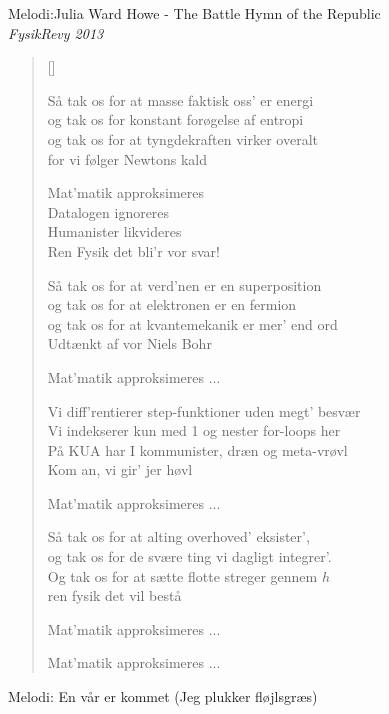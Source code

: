 {Melodi:Julia Ward Howe - The Battle Hymn of the Republic}\\[.2em]
{\small\itshape FysikRevy  2013}
\begin{multicols}{2}
\settowidth{\versewidth}{Vi diff'rentierer step-funktioner uden megt' besvær}
\begin{verse}[\versewidth]

Så tak os for at masse faktisk oss' er energi\\
og tak os for konstant forøgelse af entropi\\
og tak os for at tyngdekraften virker overalt\\
for vi følger Newtons kald

Mat'matik approksimeres\\
Datalogen ignoreres\\
Humanister likvideres\\
Ren Fysik det bli'r vor svar!

Så tak os for at verd'nen er en superposition\\
og tak os for at elektronen er en fermion\\
og tak os for at kvantemekanik er mer' end ord\\
Udtænkt af vor Niels Bohr

Mat'matik approksimeres ...

Vi diff'rentierer step-funktioner uden megt' besvær\\
Vi indekserer kun med 1 og nester for-loops her\\
På KUA har I kommunister, dræn og meta-vrøvl\\
Kom an, vi gir' jer høvl

Mat'matik approksimeres ...

Så tak os for at alting overhoved' eksister',\\
og tak os for de svære ting vi dagligt integrer'.\\
Og tak os for at sætte flotte streger gennem $h$\\
ren fysik det vil bestå

Mat'matik approksimeres ...

Mat'matik approksimeres ...
\end{verse}
\end{multicols}
\newpage

\renewcommand{\thepage}{10}
\thispagestyle{sangbog}
\renewcommand{\thepoem}{12}

\newcommand{\boldpage}[1]{{ \boldmath$#1$}}
{Melodi: En vår er kommet (Jeg plukker fløjlsgræs)}\\[.2em]

